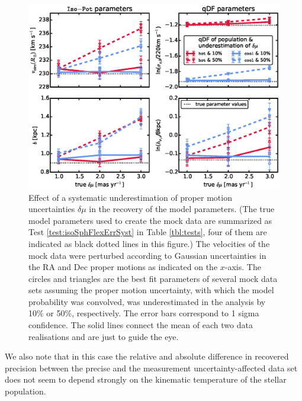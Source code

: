 \begin{figure}[!htbp]
\centering
\includegraphics[width=\columnwidth]{figs/isoSphFlexErrSyst_offset_vs_error.eps}
\caption{Effect of a systematic underestimation of proper motion uncertainties $\delta \mu$ in the recovery of the model parameters. (The true model parameters used to create the mock data are summarized as Test \ref{test:isoSphFlexErrSyst} in Table \ref{tbl:tests}, four of them are indicated as black dotted lines in this figure.) The velocities of the mock data were perturbed according to Gaussian uncertainties in the RA and Dec proper motions as indicated on the $x$-axis. The circles and triangles are the best fit parameters of several mock data sets assuming the proper motion uncertainty, with which the model probability was convolved, was underestimated in the analysis by 10\% or 50\%, respectively. The error bars correspond to 1 sigma confidence. The solid lines connect the mean of each two data realisations and are just to guide the eye.}
\label{fig:isoSphFlexErrSyst}
\end{figure}



We also note that in this case the relative and absolute difference in recovered precision between the precise and the measurement uncertainty-affected data set does not seem to depend strongly on the kinematic temperature of the stellar population.

